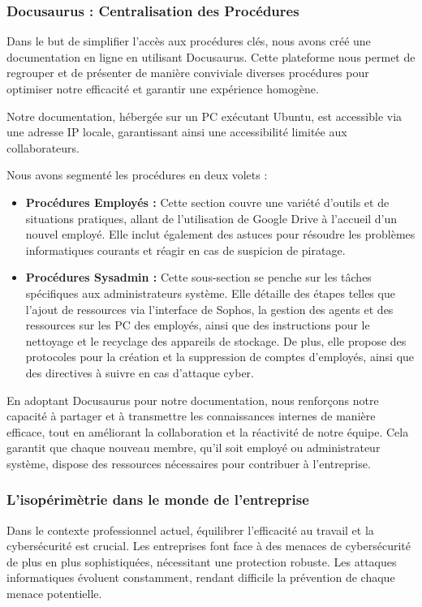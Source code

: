 \subsubsection{Docusaurus : Centralisation des Procédures}
Dans le but de simplifier l'accès aux procédures clés, nous avons créé une documentation en ligne en utilisant Docusaurus.
Cette plateforme nous permet de regrouper et de présenter de manière conviviale diverses procédures pour optimiser notre efficacité et garantir une expérience homogène.

Notre documentation, hébergée sur un PC  exécutant Ubuntu, est accessible via une adresse IP locale, garantissant ainsi une accessibilité limitée aux collaborateurs.

Nous avons segmenté les procédures en deux volets :
\begin{itemize}
    \item \textbf{Procédures Employés :} Cette section couvre une variété d'outils et de situations pratiques, allant de l'utilisation de Google Drive à l'accueil d'un nouvel employé.
    Elle inclut également des astuces pour résoudre les problèmes informatiques courants et réagir en cas de suspicion de piratage.
    \item \textbf{Procédures Sysadmin :} Cette sous-section se penche sur les tâches spécifiques aux administrateurs système.
    Elle détaille des étapes telles que l'ajout de ressources via l'interface de Sophos, la gestion des agents et des ressources sur les PC des employés, ainsi que des instructions pour le nettoyage et le recyclage des appareils de stockage.
    De plus, elle propose des protocoles pour la création et la suppression de comptes d'employés, ainsi que des directives à suivre en cas d'attaque cyber.
\end{itemize}

En adoptant Docusaurus pour notre documentation, nous renforçons notre capacité à partager et à transmettre les connaissances internes de manière efficace, tout en améliorant la collaboration et la réactivité de notre équipe.
Cela garantit que chaque nouveau membre, qu'il soit employé ou administrateur système, dispose des ressources nécessaires pour contribuer à l'entreprise. 


\subsubsection{L'isopérimètrie dans le monde de l'entreprise}
Dans le contexte professionnel actuel, équilibrer l'efficacité au travail et la cybersécurité est crucial.
Les entreprises font face à des menaces de cybersécurité de plus en plus sophistiquées, nécessitant une protection robuste.
Les attaques informatiques évoluent constamment, rendant difficile la prévention de chaque menace potentielle.

